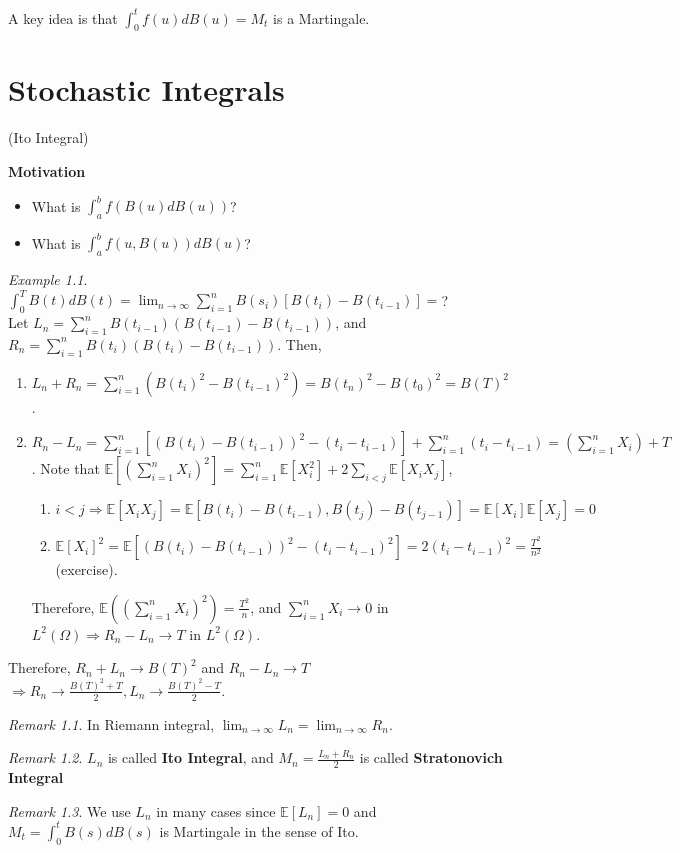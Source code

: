 \documentclass[12pt]{report}
\newcommand{\E}{\mathbb{E}}
\renewcommand{\1}{\mathbb{1}}
\renewcommand{\O}{\Omega}
\theoremstyle{break}
\theoremstyle{newdef}
\theoremstyle{remark}
\newtheorem*{exmp}{Example} %
\newtheorem*{rem}{Remark} %
\begin{document}
A key idea is that $\int_0^t f(u) dB(u) = M_t$ is a Martingale.



\setcounter{chapter}{3}
\chapter{Stochastic Integrals}
(Ito Integral)

\textbf{Motivation}
\begin{itemize}
\item What is $\int_a^b f(B(u)dB(u))$?
\item What is $\int_a^b f(u,B(u))dB(u)$?
\end{itemize}

\begin{exmp}
$\int_0^T B(t)dB(t) = \lim_{n\rightarrow\infty} \sum_{i=1}^n B(s_i) \left[B(t_i) - B(t_{i-1})\right] = $?\\
Let $L_n = \sum_{i=1}^n B(t_{i-1})(B(t_{i-1}) - B(t_{i-1}))$, and
$R_n = \sum_{i=1}^n B(t_i) (B(t_i) - B(t_{i-1}))$.
Then,
\begin{enumerate}[wide]
\item $L_n + R_n = \sum_{i=1}^n (B(t_i)^2 - B(t_{i-1})^2) = B(t_n)^2 - B(t_0)^2 = B(T)^2$.
\item $R_n - L_n = \sum_{i=1}^n [(B(t_i) - B(t_{i-1}))^2 - (t_i-t_{i-1})] + \sum_{i=1}^n (t_i - t_{i-1}) = (\sum_{i=1}^n X_i) + T$.
Note that $\E[(\sum_{i=1}^n X_i)^2] = \sum_{i=1}^n \E[X_i^2] + 2\sum_{i<j} \E[X_iX_j]$,
\begin{enumerate}
\item
$i < j \Rightarrow \E[X_iX_j] = \E[B(t_i)-B(t_{i-1}), B(t_j) - B(t_{j-1}) ] = \E[X_i]\E[X_j] = 0$

\item
$\E[X_i]^2 = \E\left[ (B(t_i)-B(t_{i-1}))^2 - (t_i - t_{i-1})^2 \right] = 2(t_i-t_{i-1})^2 = \frac{T^2}{n^2}$ (exercise).
\end{enumerate}
Therefore, $\E((\sum_{i=1}^n X_i)^2) = \frac{T^2}{n}$, and
$\sum_{i=1}^n X_i \rightarrow 0$ in $L^2(\O) \Rightarrow R_n - L_n \rightarrow T$ in $L^2(\O)$.
\end{enumerate}
Therefore, $R_n + L_n \rightarrow B(T)^2$ and $R_n - L_n \rightarrow T$\\
$\Rightarrow R_n \rightarrow \frac{B(T)^2 + T}{2}, L_n \rightarrow \frac{B(T)^2 - T}{2}$.

\begin{rem}
In Riemann integral, $\lim_{n\rightarrow\infty} L_n = \lim_{n\rightarrow\infty} R_n$.
\end{rem}

\begin{rem}
$L_n$ is called \textbf{Ito Integral}, and
$M_n = \frac{L_n + R_n}{2}$ is called \textbf{Stratonovich Integral}
\end{rem}
\begin{rem}
We use $L_n$ in many cases since $\E[L_n] = 0$ and $M_t = \int_0^t B(s) dB(s)$ is Martingale in the sense of Ito.
\end{rem}
\end{exmp}
\end{document}
